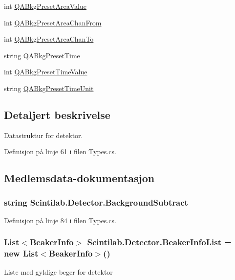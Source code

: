 \begin{DoxyCompactItemize}
\item 
int \hyperlink{class_scintilab_1_1_detector_a74d16a56156ecaaf450858cedabb932a}{Q\+A\+Bkg\+Preset\+Area\+Value}
\item 
int \hyperlink{class_scintilab_1_1_detector_ab6cf1a2a475e8c9f128885a1223028d4}{Q\+A\+Bkg\+Preset\+Area\+Chan\+From}
\item 
int \hyperlink{class_scintilab_1_1_detector_ab75478024ed32ab66838877d8a6f5f17}{Q\+A\+Bkg\+Preset\+Area\+Chan\+To}
\item 
string \hyperlink{class_scintilab_1_1_detector_a081ff00dc519d8d2a48865d01603add0}{Q\+A\+Bkg\+Preset\+Time}
\item 
int \hyperlink{class_scintilab_1_1_detector_a0ee122a2ce4420ce23973b03adae4834}{Q\+A\+Bkg\+Preset\+Time\+Value}
\item 
string \hyperlink{class_scintilab_1_1_detector_af4c9b86bde9d34e8bfdd70155f6b72a1}{Q\+A\+Bkg\+Preset\+Time\+Unit}
\end{DoxyCompactItemize}


\subsection{Detaljert beskrivelse}
Datastruktur for detektor. 

Definisjon på linje 61 i filen Types.\+cs.



\subsection{Medlemsdata-\/dokumentasjon}
\hypertarget{class_scintilab_1_1_detector_a57164b66f6f92c0443d9c9aad2bd327b}{
\subsubsection[{Background\+Subtract}]{\setlength{\rightskip}{0pt plus 5cm}string Scintilab.\+Detector.\+Background\+Subtract}}\label{class_scintilab_1_1_detector_a57164b66f6f92c0443d9c9aad2bd327b}


Definisjon på linje 84 i filen Types.\+cs.

\hypertarget{class_scintilab_1_1_detector_a2f6a3c3e640fe73d7bf19650b5f967ee}{
\subsubsection[{Beaker\+Info\+List}]{\setlength{\rightskip}{0pt plus 5cm}List$<${\bf Beaker\+Info}$>$ Scintilab.\+Detector.\+Beaker\+Info\+List = new List$<${\bf Beaker\+Info}$>$()}}\label{class_scintilab_1_1_detector_a2f6a3c3e640fe73d7bf19650b5f967ee}
Liste med gyldige beger for detektor 

